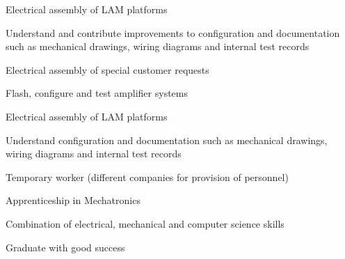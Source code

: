 \documentclass[]{resume}
\begin{document}
\begin{minipage}[t]{0.66\textwidth}
	\begin{tightemize}

	\item Electrical assembly of LAM platforms
	\item Understand and contribute improvements to configuration and documentation such as mechanical drawings, wiring diagrams and internal test records
	\item Electrical assembly of special customer requests
	\item Flash, configure and test amplifier systems

	\end{tightemize}
	\sectionsep
\begin{tightemize}

	\item Electrical assembly of LAM platforms
	\item Understand configuration and documentation such as mechanical drawings, wiring diagrams and internal test records
	\item Temporary worker (different companies for provision of personnel)

\end{tightemize}
\sectionsep
\begin{tightemize}

\item Apprenticeship in Mechatronics
\item Combination of electrical, mechanical and computer science skills
\item Graduate with good success


\end{tightemize}
\end{minipage}
\end{document}

